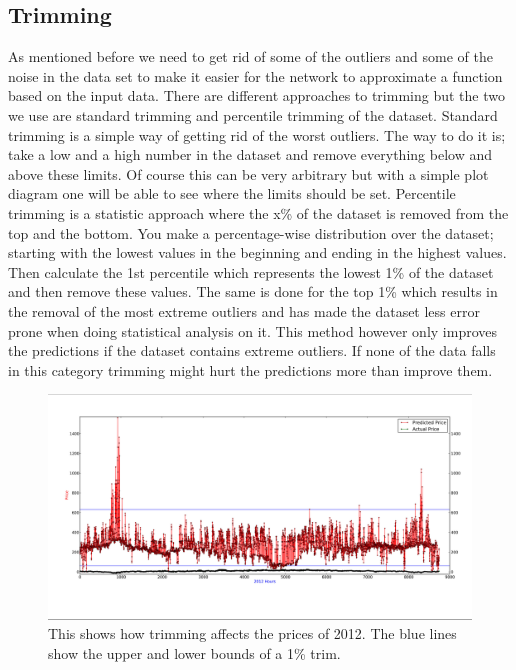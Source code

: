 \subsection{Trimming}\label{sec:Trimming}
As mentioned before we need to get rid of some of the outliers and some of the noise in the data set to make it easier for the network to approximate a function based on the input data. There are different approaches to trimming but the two we use are standard trimming and percentile trimming of the dataset. Standard trimming is a simple way of getting rid of the worst outliers. The way to do it is; take a low and a high number in the dataset and remove everything below and above these limits. Of course this can be very arbitrary but with a simple plot diagram one will be able to see where the limits should be set. Percentile trimming is a statistic approach where the x\% of the dataset is removed from the top and the bottom. You make a percentage-wise distribution over the dataset; starting with the lowest values in the beginning and ending in the highest values. Then calculate the 1st percentile which represents the lowest 1\% of the dataset and then remove these values. The same is done for the top 1\% which results in the removal of the most extreme outliers and has made the dataset less error prone when doing statistical analysis on it. This method however only improves the predictions if the dataset contains extreme outliers. If none of the data falls in this category trimming might hurt the predictions more than improve them.

\begin{figure}[!ht]
\centering
\includegraphics[width=\linewidth,natwidth=898,natheight=587]{billeder/trimming_graph.jpg}
\caption{This shows how trimming affects the prices of 2012. The blue lines show the upper and lower bounds of a 1\% trim.}
\label{fig:trimming_in_trimming_section}
\end{figure}

